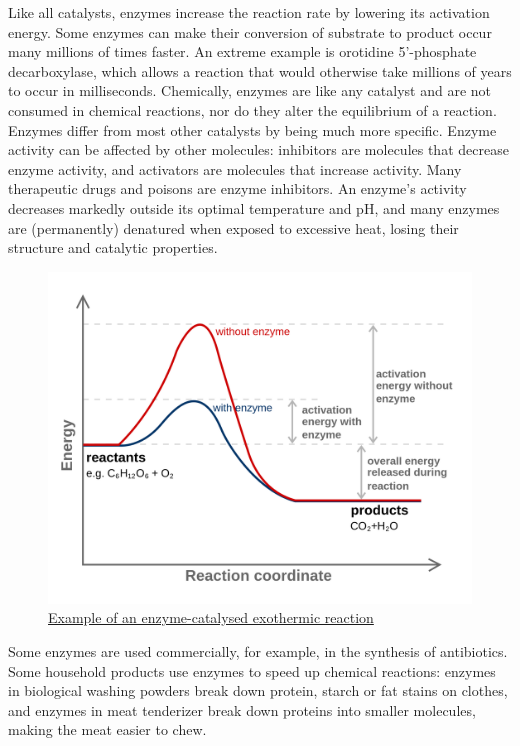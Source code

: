 Like all catalysts, enzymes increase the reaction rate by lowering its activation energy. Some enzymes can make their conversion of substrate to product occur many millions of times faster. An extreme example is orotidine 5'-phosphate decarboxylase, which allows a reaction that would otherwise take millions of years to occur in milliseconds. Chemically, enzymes are like any catalyst and are not consumed in chemical reactions, nor do they alter the equilibrium of a reaction. Enzymes differ from most other catalysts by being much more specific. Enzyme activity can be affected by other molecules: inhibitors are molecules that decrease enzyme activity, and activators are molecules that increase activity. Many therapeutic drugs and poisons are enzyme inhibitors. An enzyme's activity decreases markedly outside its optimal temperature and pH, and many enzymes are (permanently) denatured when exposed to excessive heat, losing their structure and catalytic properties.



\begin{figure}

{\centering \includegraphics[width=0.7\linewidth]{./figures/bioenergetics/Activation2_updated} 

}

\caption{\href{https://commons.wikimedia.org/wiki/File:Activation2_updated.svg}{Example of an enzyme-catalysed exothermic reaction}}\label{fig:activationenergy}
\end{figure}

Some enzymes are used commercially, for example, in the synthesis of antibiotics. Some household products use enzymes to speed up chemical reactions: enzymes in biological washing powders break down protein, starch or fat stains on clothes, and enzymes in meat tenderizer break down proteins into smaller molecules, making the meat easier to chew.

